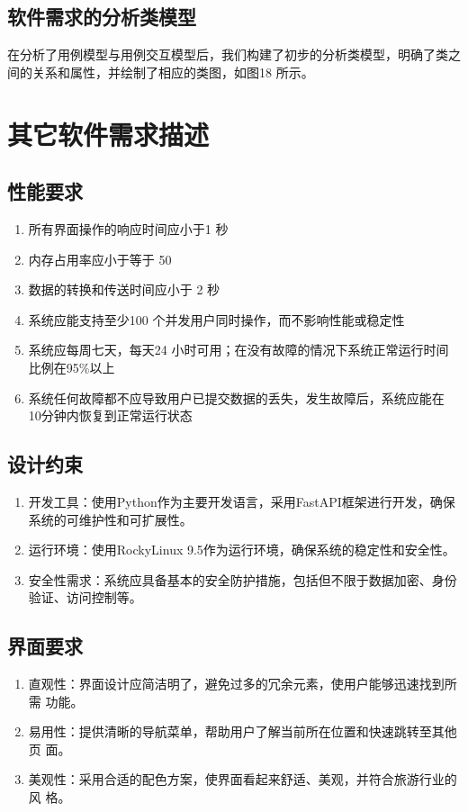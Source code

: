 \documentclass[
    report,     %
    oneside,    %
    UTF8,       %
    zihao=-4    %
]{config} %
\begin{document}
\subsection{软件需求的分析类模型}

在分析了用例模型与用例交互模型后，我们构建了初步的分析类模型，明确了类之间的关系和属性，并绘制了相应的类图，如图18 所示。

\section{其它软件需求描述}
\subsection{性能要求}
\begin{enumerate}[label=(\arabic*)]
    \item 所有界面操作的响应时间应小于1 秒
    \item 内存占用率应小于等于 50%
    \item 数据的转换和传送时间应小于 2 秒
    \item 系统应能支持至少100 个并发用户同时操作，而不影响性能或稳定性
    \item 系统应每周七天，每天24 小时可用；在没有故障的情况下系统正常运行时间比例在95\%以上
    \item 系统任何故障都不应导致用户已提交数据的丢失，发生故障后，系统应能在 10分钟内恢复到正常运行状态
\end{enumerate}

\subsection{设计约束}

\begin{enumerate}[label=(\arabic*)]
    \item 开发工具：使用Python作为主要开发语言，采用FastAPI框架进行开发，确保系统的可维护性和可扩展性。
    \item 运行环境：使用RockyLinux 9.5作为运行环境，确保系统的稳定性和安全性。
    \item 安全性需求：系统应具备基本的安全防护措施，包括但不限于数据加密、身份验证、访问控制等。
\end{enumerate}
\subsection{界面要求}
\begin{enumerate}[label=(\arabic*)]
    \item 直观性：界面设计应简洁明了，避免过多的冗余元素，使用户能够迅速找到所需
    功能。
    \item 易用性：提供清晰的导航菜单，帮助用户了解当前所在位置和快速跳转至其他页
    面。
    \item 美观性：采用合适的配色方案，使界面看起来舒适、美观，并符合旅游行业的风
    格。
\end{enumerate}
\end{document}

